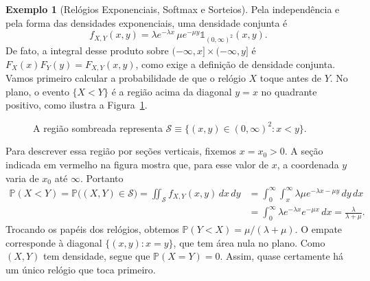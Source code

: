 \documentclass[12pt,portuguese]{article}
\theoremstyle{definition}
\newtheorem{example}[example]{Exemplo}
\theoremstyle{plainexercise}
\theoremstyle{starredexercise}
\theoremstyle{definition}
\begin{document}
\begin{example}[Relógios Exponenciais, Softmax e Sorteios]
Pela independência e pela forma das densidades exponenciais, uma densidade
conjunta é
\[
  f_{X,Y}(x,y)
  = \lambda e^{-\lambda x}\,\mu e^{-\mu y}
  \mathds{1}_{(0,\infty)^2}(x,y).
\]
De fato, a integral desse produto sobre
$(-\infty,x]\times(-\infty,y]$ é $F_X(x)F_Y(y)=F_{X,Y}(x,y)$, como exige
a definição de densidade conjunta.
Vamos primeiro calcular a probabilidade de que o relógio $X$ toque antes de
$Y$. No plano, o evento $\{X<Y\}$ é a região acima da diagonal $y=x$ no
quadrante positivo, como ilustra a Figura~\ref{fig:regiao-x-menor-y}.
\begin{figure}[H]
\centering
{}
\captionsetup{width=\textwidth}
\caption{A região sombreada representa $\mathcal{S}\equiv \{(x,y)\in(0,\infty)^2:x<y\}$.}
\label{fig:regiao-x-menor-y}
\end{figure}
Para descrever essa região por seções verticais, fixemos $x=x_0>0$. A seção
indicada em vermelho na figura mostra que, para esse valor de $x$, a coordenada
$y$ varia de $x_0$ até $\infty$. Portanto
\begin{align*}
  \mathbb{P}(X<Y)
  =
  \mathbb{P}\bigl( (X,Y)\in\mathcal{S} \bigr)
  =
  \iint_{\mathcal{S}} f_{X,Y}(x,y)\, dx\,dy
  &= \int_0^\infty\int_x^\infty
  \lambda\mu e^{-\lambda x-\mu y}\,dy\,dx
  \\[0.3cm]
  &= \int_0^\infty \lambda e^{-\lambda x}e^{-\mu x}\,dx
  = \frac{\lambda}{\lambda+\mu}.
\end{align*}
Trocando os papéis dos relógios, obtemos
$\mathbb{P}(Y<X)=\mu/(\lambda+\mu)$. O empate corresponde à diagonal
$\{(x,y):x=y\}$, que tem área nula no plano. Como $(X,Y)$ tem densidade,
segue que $\mathbb{P}(X=Y)=0$. Assim, quase certamente há um único relógio
que toca primeiro.


\end{example}
\end{document}
